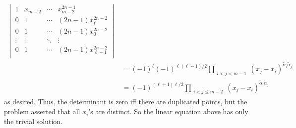 \documentclass{homework}
\begin{document}
{\begin{align*}
\begin{vmatrix}
        1      & x_{m-2} & \cdots & x_{m-2}^{2n-1}           \\
        0      & 1       & \cdots & (2n-1) x_\ell^{2n-2}     \\
        0      & 1       & \cdots & (2n-1) x_0^{2n-2}        \\
        \vdots & \vdots  & \ddots & \vdots                   \\
        0      & 1       & \cdots & (2n-1) x_{\ell-1}^{2n-2} \\
    \end{vmatrix}
    \\&= (-1)^{\ell}(-1)^{\ell(\ell-1)/2} \prod_{\substack{i<j<m-1}} (x_j-x_i)^{\tilde\alpha_i\tilde\alpha_j}
    \\&=(-1)^{(\ell+1)\ell/2} \prod_{\substack{i<j\le m-2}} (x_j-x_i)^{\tilde\alpha_i\tilde\alpha_j}
\end{align*}
as desired. Thus, the determinant is zero iff there are duplicated points, but the problem asserted that all $x_i$'s are distinct. So the linear equation above has only the trivial solution.
}
\end{document}

